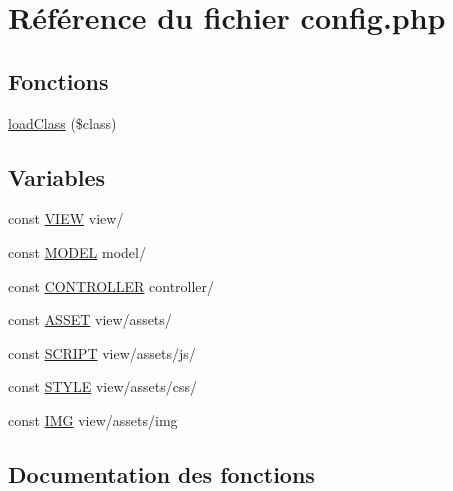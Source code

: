 \hypertarget{config_8php}{}\section{Référence du fichier config.\+php}
\label{config_8php}
\subsection*{Fonctions}
\begin{DoxyCompactItemize}
\item 
\hyperlink{config_8php_a8326a997d0cfe76d80196f60d240d144}{load\+Class} (\$class)
\end{DoxyCompactItemize}
\subsection*{Variables}
\begin{DoxyCompactItemize}
\item 
const \hyperlink{config_8php_aef7c7a92cfbdbb6c095d208691c9d872}{V\+I\+EW} \textquotesingle{}view/\textquotesingle{}
\item 
const \hyperlink{config_8php_a5b3f890200f757fae7f62a66f96a6f63}{M\+O\+D\+EL} \textquotesingle{}model/\textquotesingle{}
\item 
const \hyperlink{config_8php_afa55a6839ec4ad32fc00879d78229356}{C\+O\+N\+T\+R\+O\+L\+L\+ER} \textquotesingle{}controller/\textquotesingle{}
\item 
const \hyperlink{config_8php_a0a793564f75d8d8a378fe2cbb24a6c4c}{A\+S\+S\+ET} \textquotesingle{}view/assets/\textquotesingle{}
\item 
const \hyperlink{config_8php_ad9968be2511ce153149eb4050c77db15}{S\+C\+R\+I\+PT} \textquotesingle{}view/assets/js/\textquotesingle{}
\item 
const \hyperlink{config_8php_a2b837978f2db2667a52c5a7ec05d7e58}{S\+T\+Y\+LE} \textquotesingle{}view/assets/css/\textquotesingle{}
\item 
const \hyperlink{config_8php_a22490e314a272149d11cf7999def5abe}{I\+MG} \textquotesingle{}view/assets/img\textquotesingle{}
\end{DoxyCompactItemize}


\subsection{Documentation des fonctions}
